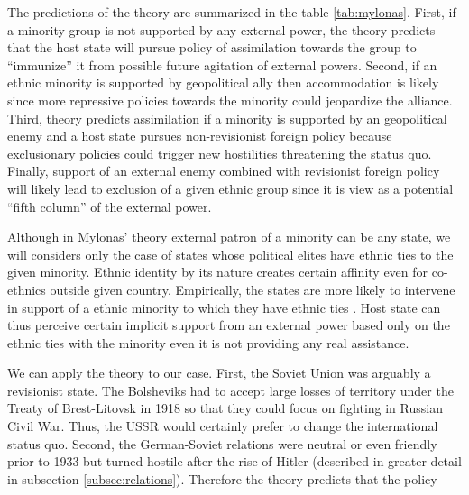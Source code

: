 The predictions of the theory are summarized in the table \ref{tab:mylonas}. First, if a minority group is not supported by any external power, the theory predicts that the host state will pursue policy of assimilation towards the group to \enquote{immunize} it from possible future  agitation  of external powers. Second, if an ethnic minority is supported by geopolitical ally then accommodation is likely since more repressive policies towards the minority could jeopardize the alliance. Third, theory predicts assimilation if a minority is supported by an geopolitical enemy and a host state pursues non-revisionist foreign policy because exclusionary policies could trigger new hostilities threatening the status quo. 
Finally, support of an external enemy combined with revisionist foreign policy will likely lead to exclusion of a given ethnic group since it is view as a potential \enquote{fifth column} of the external power. 




Although in Mylonas' theory  external patron of a minority can be any state, 
we will considers only the  case of states whose political elites have ethnic ties to the given minority.  
Ethnic identity by its nature creates certain affinity even for co-ethnics outside given country. Empirically, the states are more likely to intervene in support of a 
ethnic minority to which they have ethnic ties \citet{saideman_ties_2001, saideman_discrimination_2002}. 
Host state can thus perceive certain implicit support from an external power based only on  the ethnic ties with the minority even it is not providing any real assistance. 


We can apply the theory to our case. First, the Soviet Union was arguably a revisionist state. The Bolsheviks had to accept large losses of territory under the Treaty of Brest-Litovsk in 1918 so that they could focus on fighting in Russian Civil War. Thus, the USSR would certainly prefer to change the international status quo. Second, the German-Soviet relations were neutral or even  friendly prior to 1933 but turned hostile after the rise of Hitler (described in greater detail in subsection \ref{subsec:relations}). Therefore the theory predicts that the policy 


